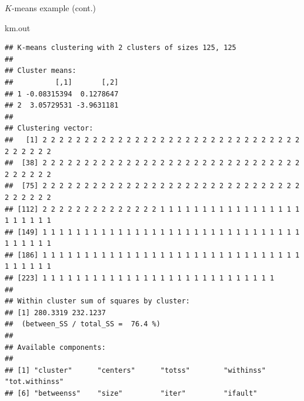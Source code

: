 \documentclass[
  ignorenonframetext,
]{beamer}
\newenvironment{Shaded}{\begin{snugshade}}{\end{snugshade}}
\newcommand{\NormalTok}[1]{#1}
\begin{document}
\begin{frame}[fragile]{\(K\)-means example (cont.)}
\protect\hypertarget{k-means-example-cont.}{}

\tiny

\begin{Shaded}
\begin{Highlighting}[]
\NormalTok{km.out}
\end{Highlighting}
\end{Shaded}

\begin{verbatim}
## K-means clustering with 2 clusters of sizes 125, 125
## 
## Cluster means:
##          [,1]       [,2]
## 1 -0.08315394  0.1278647
## 2  3.05729531 -3.9631181
## 
## Clustering vector:
##   [1] 2 2 2 2 2 2 2 2 2 2 2 2 2 2 2 2 2 2 2 2 2 2 2 2 2 2 2 2 2 2 2 2 2 2 2 2 2
##  [38] 2 2 2 2 2 2 2 2 2 2 2 2 2 2 2 2 2 2 2 2 2 2 2 2 2 2 2 2 2 2 2 2 2 2 2 2 2
##  [75] 2 2 2 2 2 2 2 2 2 2 2 2 2 2 2 2 2 2 2 2 2 2 2 2 2 2 2 2 2 2 2 2 2 2 2 2 2
## [112] 2 2 2 2 2 2 2 2 2 2 2 2 2 2 1 1 1 1 1 1 1 1 1 1 1 1 1 1 1 1 1 1 1 1 1 1 1
## [149] 1 1 1 1 1 1 1 1 1 1 1 1 1 1 1 1 1 1 1 1 1 1 1 1 1 1 1 1 1 1 1 1 1 1 1 1 1
## [186] 1 1 1 1 1 1 1 1 1 1 1 1 1 1 1 1 1 1 1 1 1 1 1 1 1 1 1 1 1 1 1 1 1 1 1 1 1
## [223] 1 1 1 1 1 1 1 1 1 1 1 1 1 1 1 1 1 1 1 1 1 1 1 1 1 1 1 1
## 
## Within cluster sum of squares by cluster:
## [1] 280.3319 232.1237
##  (between_SS / total_SS =  76.4 %)
## 
## Available components:
## 
## [1] "cluster"      "centers"      "totss"        "withinss"     "tot.withinss"
## [6] "betweenss"    "size"         "iter"         "ifault"
\end{verbatim}

\end{frame}
\end{document}
